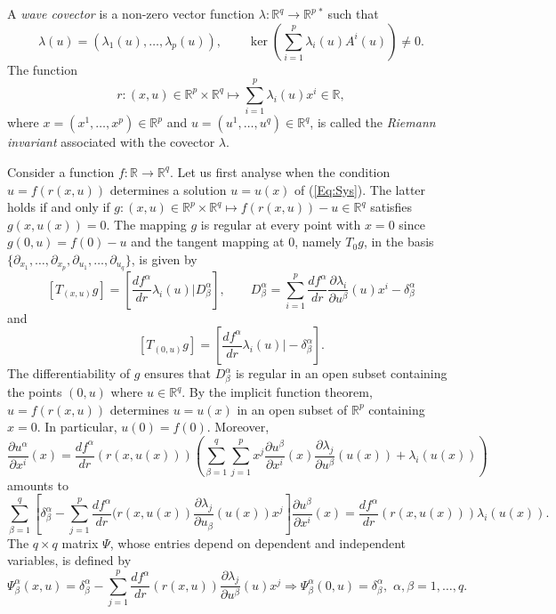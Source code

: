 \documentclass{birkjour}
\theoremstyle{definition}
\theoremstyle{remark}
\numberwithin{equation}{section}
\numberwithin{equation}{section}
\numberwithin{thm}{section}
\numberwithin{equation}{section}
\numberwithin{thm}{section}
\begin{document}
A {\it wave covector} is a non-zero vector function $\lambda:\mathbb{R}^q\rightarrow \mathbb{R}^p\,\!^*$  such that 
$$
\lambda(u)=(\lambda_1(u),\ldots,\lambda_p(u)),\qquad \ker \left(\sum_{i=1}^p\lambda_i(u)A^i(u)\right)\neq 0.
$$
The function 
\begin{equation}\label{RI}
	r:(x,u)\in \mathbb{R}^p\times \mathbb{R}^q\mapsto \sum_{i=1}^p\lambda_i(u)x^i \in \mathbb{R},
\end{equation} where $x=(x^1,\ldots,x^p)\in \mathbb{R}^p$ and $u=(u^1,\ldots,u^q)\in \mathbb{R}^q$, 
is called the {\it Riemann invariant} associated with the covector $\lambda$. 

Consider a function
$
f:\mathbb{R}\rightarrow \mathbb{R}^q.
$
Let us first analyse when the condition $u=f(r(x,u))$ determines a solution $u=u(x)$ of (\ref{Eq:Sys}). The latter holds if and only if $g:(x,u)\in \mathbb{R}^p\times \mathbb{R}^q\mapsto f(r(x,u))-u\in \mathbb{R}^q$ satisfies  $g(x,u(x))=0$. The mapping $g$ is regular at every  point with $x=0$ since $g(0,u)=f(0)-u$ and the tangent mapping at 0, namely $T_0g$, in the basis $\{\partial_{ x_1},\ldots, \partial_{x_p}, \partial_{u_1},\ldots,\partial_{u_q}\}$, is given by 
$$
[T_{(x,u)}g]=\left[\frac{df^\alpha}{dr}\lambda_i(u)\bigg| D^\alpha_\beta\right],\qquad 
D_\beta^\alpha=\sum_{i=1}^p\frac{df^\alpha}{dr}\frac{\partial \lambda_i}{\partial u^\beta}(u)x^i-\delta^\alpha_\beta
$$ 
and 
$$
[T_{(0,u)}g]=\left[\frac{df^\alpha}{dr}\lambda_i(u)\bigg| -\delta^\alpha_\beta\right].
$$
The differentiability of $g$ ensures that $D^\alpha_\beta$ is regular in an open subset containing the points $(0,u)$ where $u\in \mathbb{R}^q$. By the implicit function theorem, $u=f(r(x,u))$  determines $u=u(x)$ in an open subset of $\mathbb{R}^p$ containing $x=0$. In particular, $u(0)=f(0)$. Moreover,
\begin{equation}\label{Eq:partial}
	\frac{\partial u^\alpha}{\partial x^i}(x)=\frac{df^\alpha}{dr}(r(x,u(x)))\left(\sum_{\beta=1}^q\sum_{j=1}^px^j\frac{\partial u^\beta}{\partial x^i}(x)\frac{\partial \lambda_j}{\partial u^\beta}(u(x))+\lambda_i(u(x))\right)
\end{equation}
amounts to 
$$ \sum_{\beta=1}^q\!\left[\delta^\alpha_\beta\!-\!\sum_{j=1}^p\frac{df^\alpha}{dr}(r(x,u(x))\frac{\partial \lambda_j}{\partial u_\beta}(u(x))x^j\right]\!\frac{\partial u^\beta}{\partial x^i}(x)\!=\!\frac{df^\alpha}{dr}(r(x,u(x)))\lambda_i(u(x)).
$$
The $q\times q$ matrix $\Psi$, whose entries depend on dependent and independent variables, is defined by
$$
\Psi^\alpha_\beta(x,u)=\delta^\alpha_\beta-\sum_{j=1}^p\frac{df^\alpha}{dr}(r(x,u))\frac{\partial \lambda_j}{\partial u^\beta}(u)x^j\Rightarrow \Psi^\alpha_\beta(0,u)=\delta^\alpha_\beta,\,\, \alpha,\beta=1,\ldots,q.
$$
\end{document}
